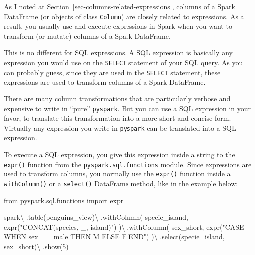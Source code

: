 \documentclass[
  11pt,
  letterpaper,
  DIV=11,
  numbers=noendperiod]{scrreprt}
\newenvironment{Shaded}{\begin{snugshade}}{\end{snugshade}}
\newcommand{\DecValTok}[1]{\textcolor[rgb]{0.68,0.00,0.00}{#1}}
\newcommand{\ImportTok}[1]{\textcolor[rgb]{0.00,0.46,0.62}{#1}}
\newcommand{\NormalTok}[1]{\textcolor[rgb]{0.00,0.23,0.31}{#1}}
\newcommand{\OperatorTok}[1]{\textcolor[rgb]{0.37,0.37,0.37}{#1}}
\newcommand{\StringTok}[1]{\textcolor[rgb]{0.13,0.47,0.30}{#1}}
\begin{document}
As I noted at Section~\ref{sec-columns-related-expressions}, columns of
a Spark DataFrame (or objects of class \texttt{Column}) are closely
related to expressions. As a result, you usually use and execute
expressions in Spark when you want to transform (or mutate) columns of a
Spark DataFrame.

This is no different for SQL expressions. A SQL expression is basically
any expression you would use on the \texttt{SELECT} statement of your
SQL query. As you can probably guess, since they are used in the
\texttt{SELECT} statement, these expressions are used to transform
columns of a Spark DataFrame.

There are many column transformations that are particularly verbose and
expensive to write in ``pure'' \texttt{pyspark}. But you can use a SQL
expression in your favor, to translate this transformation into a more
short and concise form. Virtually any expression you write in
\texttt{pyspark} can be translated into a SQL expression.

To execute a SQL expression, you give this expression inside a string to
the \texttt{expr()} function from the \texttt{pyspark.sql.functions}
module. Since expressions are used to transform columns, you normally
use the \texttt{expr()} function inside a \texttt{withColumn()} or a
\texttt{select()} DataFrame method, like in the example below:

\begin{Shaded}
\begin{Highlighting}[]
\ImportTok{from}\NormalTok{ pyspark.sql.functions }\ImportTok{import}\NormalTok{ expr}

\NormalTok{spark}\OperatorTok{\textbackslash{}}
\NormalTok{  .table(}\StringTok{\textquotesingle{}penguins\_view\textquotesingle{}}\NormalTok{)}\OperatorTok{\textbackslash{}}
\NormalTok{  .withColumn(}
    \StringTok{\textquotesingle{}specie\_island\textquotesingle{}}\NormalTok{,}
\NormalTok{    expr(}\StringTok{"CONCAT(species, \textquotesingle{}\_\textquotesingle{}, island)"}\NormalTok{)}
\NormalTok{  )}\OperatorTok{\textbackslash{}}
\NormalTok{  .withColumn(}
    \StringTok{\textquotesingle{}sex\_short\textquotesingle{}}\NormalTok{,}
\NormalTok{    expr(}\StringTok{"CASE WHEN sex == \textquotesingle{}male\textquotesingle{} THEN \textquotesingle{}M\textquotesingle{} ELSE \textquotesingle{}F\textquotesingle{} END"}\NormalTok{)}
\NormalTok{  )}\OperatorTok{\textbackslash{}}
\NormalTok{  .select(}\StringTok{\textquotesingle{}specie\_island\textquotesingle{}}\NormalTok{, }\StringTok{\textquotesingle{}sex\_short\textquotesingle{}}\NormalTok{)}\OperatorTok{\textbackslash{}}
\NormalTok{  .show(}\DecValTok{5}\NormalTok{)}
\end{Highlighting}
\end{Shaded}
\end{document}
